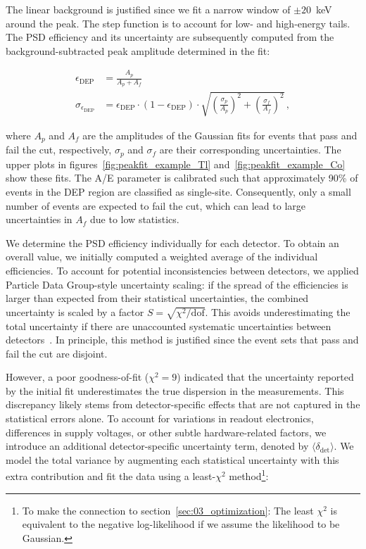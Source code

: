 The linear background is justified since we fit a narrow window of $\pm 20$~keV around the peak. The step function is to account for low- and high-energy tails. 
The PSD efficiency and its uncertainty are subsequently computed from the background-subtracted peak amplitude determined in the fit:

\begin{align}
\label{eq:eff_DEP}
    \epsilon_{\mathrm{DEP}} & = \frac{A_p}{A_p + A_f} \\
    \sigma_{\epsilon_{\mathrm{DEP}}} & = \epsilon_{\mathrm{DEP}} \cdot (1 - \epsilon_{\mathrm{DEP}}) \cdot \sqrt{\left(\frac{\sigma_p}{A_p} \right)^2 + \left( \frac{\sigma_f}{A_f} \right)^2} \,,
\label{eq:eff_DEP_err}
\end{align}

\noindent where $A_p$ and $A_f$ are the amplitudes of the Gaussian fits for events that pass and fail the cut, respectively, $\sigma_p$ and $\sigma_f$ are their corresponding uncertainties. The upper plots in figures~\ref{fig:peakfit_example_Tl} and~\ref{fig:peakfit_example_Co} show these fits. 
The A/E parameter is calibrated such that approximately 90\% of events in the DEP region are classified as single-site. Consequently, only a small number of events are expected to fail the cut, which can lead to large uncertainties in $A_f$ due to low statistics.

We determine the PSD efficiency individually for each detector. To obtain an overall value, we initially computed a weighted average of the individual efficiencies. To account for potential inconsistencies between detectors, we applied Particle Data Group-style uncertainty scaling: if the spread of the efficiencies is larger than expected from their statistical uncertainties, the combined uncertainty is scaled by a factor $S = \sqrt{\chi^2/\mathrm{dof}}$. This avoids underestimating the total uncertainty if there are unaccounted systematic uncertainties between detectors~\cite{navas_review_2024}. In principle, this method is justified since the event sets that pass and fail the cut are disjoint. 

However, a poor goodness-of-fit ($\chi^2 = 9$) indicated that the uncertainty reported by the initial fit underestimates the true dispersion in the measurements. 
This discrepancy likely stems from detector-specific effects that are not captured in the statistical errors alone. To account for variations in readout electronics, differences in supply voltages, or other subtle hardware-related factors, we introduce an additional detector-specific uncertainty term, denoted by $\langle \delta_{\mathrm{det}} \rangle$. 
We model the total variance by augmenting each statistical uncertainty with this extra contribution and fit the data using a least-$\chi^2$ method\footnote{To make the connection to section~\ref{sec:03_optimization}: The least $\chi^2$ is equivalent to the negative log-likelihood if we assume the likelihood to be Gaussian.}:

